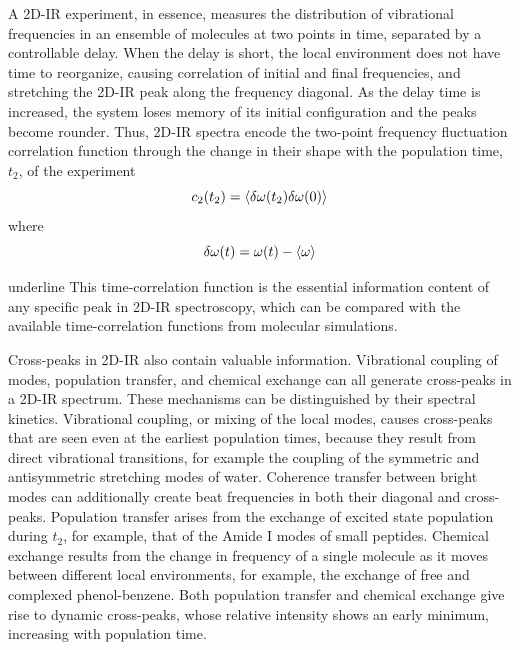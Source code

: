 \documentclass[%
  class = book,%
  crop = false,%
  float = true,%
  multi = true,%
  preview = false,%
]{standalone}
\let\cite\autocite
\begin{document}
A 2D-IR experiment, in essence, measures the distribution of vibrational frequencies in an ensemble of molecules at two points in time, separated by a controllable delay. When the delay is short, the local environment does not have time to reorganize, causing correlation of initial and final frequencies, and stretching the 2D-IR peak along the frequency diagonal. As the delay time is increased, the system loses memory of its initial configuration and the peaks become rounder. Thus, 2D-IR spectra encode the two-point frequency fluctuation correlation function through the change in their shape with the population time, \(t_2\), of the experiment
\begin{equation}
  \label{eq:FFCF}
  c_2(t_2) = \braket{\delta\omega(t_2)\delta\omega(0)}
\end{equation}
where 
\begin{equation}
  \delta\omega(t) = \omega(t) - \braket{\omega}
\end{equation}
\begin{akdjwarning}{underline}
This time-correlation function is the essential information content of any specific peak in 2D-IR spectroscopy, which can be compared with the available time-correlation functions from molecular simulations.
\end{akdjwarning}
Cross-peaks in 2D-IR also contain valuable information. Vibrational coupling of modes, population transfer, and chemical exchange can all generate cross-peaks in a 2D-IR spectrum. These mechanisms can be distinguished by their spectral kinetics. Vibrational coupling, or mixing of the local modes, causes cross-peaks that are seen even at the earliest population times, because they result from direct vibrational transitions, for example the coupling of the symmetric and antisymmetric stretching modes of water.\cite{wongJPCB-13} Coherence transfer between bright modes can additionally create beat frequencies in both their diagonal and cross-peaks.\cite{wongJPCB-13} Population transfer arises from the exchange of excited state population during \(t_2\), for example, that of the Amide I modes of small peptides.\cite{Woutersen2001} Chemical exchange results from the change in frequency of a single molecule as it moves between different local environments, for example, the exchange of free and complexed phenol-benzene.\cite{Zheng2005} Both population transfer and chemical exchange give rise to dynamic cross-peaks, whose relative intensity shows an early minimum, increasing with population time.
\end{document}
